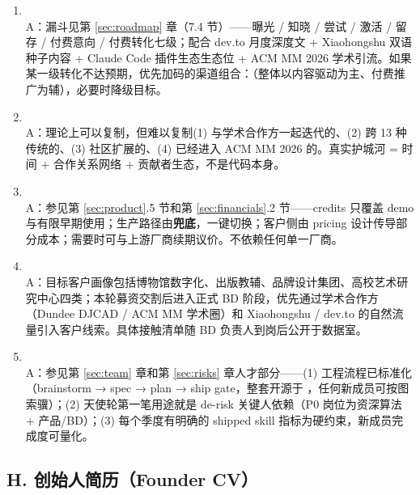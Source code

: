 \begin{enumerate}
  \item {}\\
  A：漏斗见第 \ref{sec:roadmap} 章（7.4 节）——曝光 / 知晓 / 尝试 / 激活 / 留存 / 付费意向 / 付费转化七级；配合 dev.to 月度深度文 + Xiaohongshu 双语种子内容 + Claude Code 插件生态生态位 + ACM MM 2026 学术引流。如果某一级转化不达预期，优先加码的渠道组合：（整体以内容驱动为主、付费推广为辅），必要时降级目标。
  \item {}\\
  A：理论上可以复制，但难以复制(1) 与学术合作方一起迭代的、(2) 跨 13 种传统的、(3) 社区扩展的、(4) 已经进入 ACM MM 2026 的。真实护城河 = 时间 + 合作关系网络 + 贡献者生态，不是代码本身。
  \item {}\\
  A：参见第 \ref{sec:product}.5 节和第 \ref{sec:financials}.2 节——credits 只覆盖 demo 与有限早期使用；生产路径由\textbf{兜底}，一键切换；客户侧由 pricing 设计传导部分成本；需要时可与上游厂商续期议价。不依赖任何单一厂商。
  \item {}\\
  A：目标客户画像包括博物馆数字化、出版教辅、品牌设计集团、高校艺术研究中心四类；本轮募资交割后进入正式 BD 阶段，优先通过学术合作方（Dundee DJCAD / ACM MM 学术圈）和 Xiaohongshu / dev.to 的自然流量引入客户线索。具体接触清单随 BD 负责人到岗后公开于数据室。
  \item {}\\
  A：参见第 \ref{sec:team} 章和第 \ref{sec:risks} 章人才部分——(1) 工程流程已标准化（brainstorm → spec → plan → ship gate，整套开源于 ，任何新成员可按图索骥）；(2) 天使轮第一笔用途就是 de-risk 关键人依赖（P0 岗位为资深算法 + 产品/BD）；(3) 每个季度有明确的 shipped skill 指标为硬约束，新成员完成度可量化。
\end{enumerate}

\subsection*{H. 创始人简历（Founder CV）}

